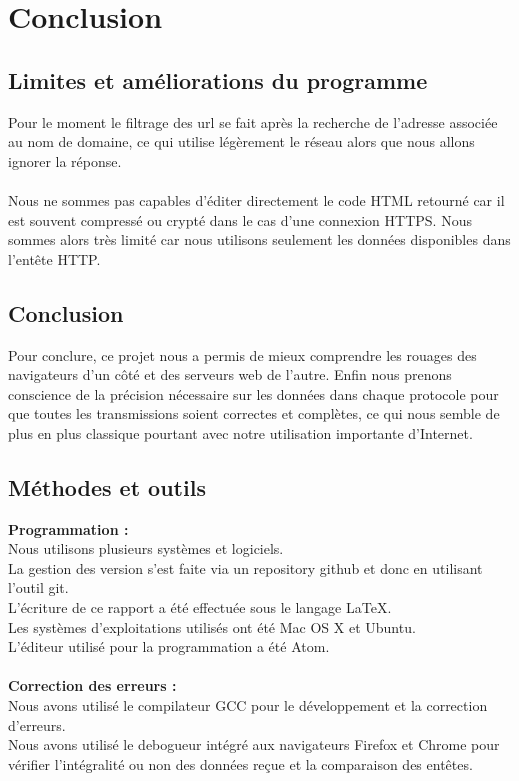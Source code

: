\documentclass{scrreprt}
\begin{document}
\chapter{Conclusion}

\section{Limites et améliorations du programme}
Pour le moment le filtrage des url se fait après la recherche de l'adresse associée au nom de domaine, ce qui utilise légèrement le réseau alors que nous allons ignorer la réponse.\\
\\
Nous ne sommes pas capables d'éditer directement le code HTML retourné car il est souvent compressé ou crypté dans le cas d'une connexion HTTPS. Nous sommes alors très limité car nous utilisons seulement les données disponibles dans l'entête HTTP.\\


\section{Conclusion}
Pour conclure, ce projet nous a permis de mieux comprendre les rouages des navigateurs d'un côté et des serveurs web de l'autre. Enfin nous prenons conscience de la précision nécessaire sur les données dans chaque protocole pour que toutes les transmissions soient correctes et complètes, ce qui nous semble de plus en plus classique pourtant avec notre utilisation importante d'Internet.

\section{Méthodes et outils}
\textbf{Programmation :}\\
Nous utilisons plusieurs systèmes et logiciels.\\
La gestion des version s'est faite via un repository github et donc en utilisant l'outil git.\\
L'écriture de ce rapport a été effectuée sous le langage LaTeX.\\
Les systèmes d'exploitations utilisés ont été Mac OS X et Ubuntu.\\
L'éditeur utilisé pour la programmation a été Atom.\\\\
\textbf{Correction des erreurs :}\\
Nous avons utilisé le compilateur GCC pour le développement et la correction d'erreurs.\\
Nous avons utilisé le debogueur intégré aux navigateurs Firefox et Chrome pour vérifier l'intégralité ou non des données reçue et la comparaison des entêtes.
\end{document}
